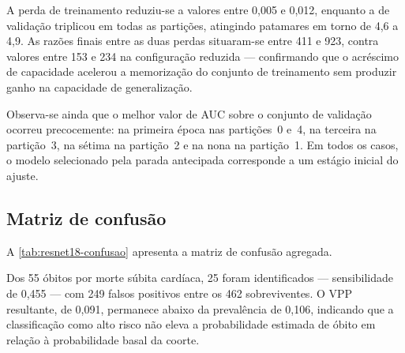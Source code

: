 A perda de treinamento reduziu-se a valores entre 0,005 e 0,012, enquanto a
de validação triplicou em todas as partições, atingindo patamares em torno de
4,6 a 4,9. As razões finais entre as duas perdas situaram-se entre 411 e 923,
contra valores entre 153 e 234 na configuração reduzida --- confirmando que o
acréscimo de capacidade acelerou a memorização do conjunto de treinamento sem
produzir ganho na capacidade de generalização.

Observa-se ainda que o melhor valor de \gls{AUC} sobre o conjunto de
validação ocorreu precocemente: na primeira época nas partições~0 e~4, na
terceira na partição~3, na sétima na partição~2 e na nona na partição~1. Em
todos os casos, o modelo selecionado pela parada antecipada corresponde a um
estágio inicial do ajuste.

\subsection{Matriz de confusão}
\label{subsec:confusao-resnet18}

A \autoref{tab:resnet18-confusao} apresenta a matriz de confusão agregada.

\begin{table}[h!]
	\captionsetup{width=11cm}
\end{table}

Dos 55 óbitos por morte súbita cardíaca, 25 foram identificados ---
sensibilidade de 0,455 --- com 249 falsos positivos entre os 462
sobreviventes. O \gls{VPP} resultante, de 0,091, permanece abaixo da
prevalência de 0,106, indicando que a classificação como alto risco não eleva
a probabilidade estimada de óbito em relação à probabilidade basal da coorte.


